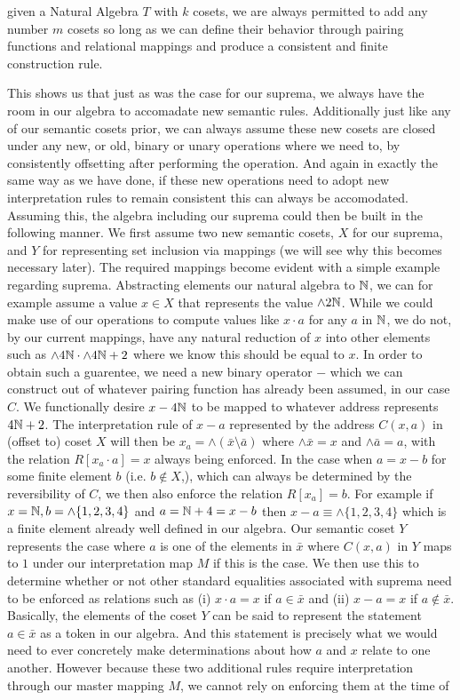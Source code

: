 \documentclass[12pt]{amsart}
\begin{document}
\begin{thm}
	given a Natural Algebra $T$ with $k$ cosets, we are always permitted to add any number $m$ cosets so long as we can define their behavior through pairing functions and relational mappings and produce a consistent and finite construction rule.
\end{thm}

This shows us that just as was the case for our suprema, we always have the room in our algebra to accomadate new semantic rules. Additionally just like any of our semantic cosets prior, we can always assume these new cosets are closed under any new, or old, binary or unary operations where we need to, by consistently offsetting after performing the operation. And again in exactly the same way as we have done, if these new operations need to adopt new interpretation rules to remain consistent this can always be accomodated. Assuming this, the algebra including our suprema could then be built in the following manner. We first assume two new semantic cosets, $X$ for our suprema, and $Y$ for representing set inclusion via mappings (we will see why this becomes necessary later). The required mappings become evident with a simple example regarding suprema. Abstracting elements our natural algebra to $\mathbb{N}$, we can for example assume a value $x\in X$ that represents the value $\wedge 2\mathbb{N}$. While we could make use of our operations to compute values like $x\cdot a$ for any $a$ in $\mathbb{N}$, we do not, by our current mappings, have any natural reduction of $x$ into other elements such as $\wedge 4\mathbb{N} \cdot  \wedge 4\mathbb{N}+2$ where we know this should be equal to $x$. In order to obtain such a guarentee, we need a new binary operator $-$ which we can construct out of whatever pairing function has already been assumed, in our case $C$. We functionally desire $x-4\mathbb{N}$ to be mapped to whatever address represents $4\mathbb{N} + 2$. The interpretation rule of $x-a$ represented by the address $C(x,a)$ in (offset to) coset $X$ will then be $x_a = \wedge (\bar{x}\setminus \bar{a}) $ where $\wedge\bar{x} = x$ and $\wedge\bar{a} = a$, with the relation $R[x_a\cdot a]= x$ always being enforced. In the case when $a = x-b$ for some finite element $b$ (i.e. $b\not\in X$,), which can always be determined by the reversibility of $C$, we then also enforce the relation $R[x_a] = b$. For example if $x = \mathbb{N}, b = \wedge\{1,2,3,4\}$ and $a = \mathbb{N} + 4 = x - b$ then $x-a \equiv \wedge\{1,2,3,4\}$ which is a finite element already well defined in our algebra. Our semantic coset $Y$ represents the case where $a$ is one of the elements in $\bar{x}$ where $C(x,a)$ in $Y$ maps to $1$ under our interpretation map $M$ if this is the case. We then use this to determine whether or not other standard equalities associated with suprema need to be enforced as relations such as (i) $x\cdot a = x$ if $a\in\bar{x}$ and (ii) $x-a = x$ if $a\not\in\bar{x}$. Basically, the elements of the coset $Y$ can be said to represent the statement $a\in \bar{x}$ as a token in our algebra. And this statement is precisely what we would need to ever concretely make determinations about how $a$ and $x$ relate to one another. However because these two additional rules require interpretation through our master mapping $M$, we cannot rely on enforcing them at the time of 
\end{document}
